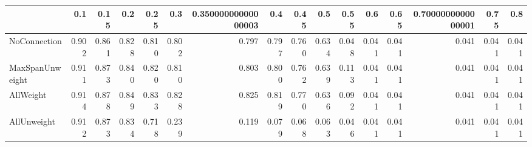 \begin{tabular}{lrrrrrrrrrrrrrrr}
\toprule
{} &   0.1 &  0.15 &   0.2 &  0.25 &   0.3 & 0.35000000000000003 &   0.4 &  0.45 &   0.5 &  0.55 &   0.6 &  0.65 & 0.7000000000000001 &  0.75 &   0.8 \\
\midrule
NoConnection    & 0.902 & 0.861 & 0.828 & 0.810 & 0.802 &               0.797 & 0.797 & 0.760 & 0.634 & 0.048 & 0.041 & 0.041 &              0.041 & 0.041 & 0.041 \\
MaxSpanUnweight & 0.911 & 0.873 & 0.840 & 0.820 & 0.810 &               0.803 & 0.800 & 0.762 & 0.639 & 0.113 & 0.041 & 0.041 &              0.041 & 0.041 & 0.041 \\
AllWeight       & 0.914 & 0.878 & 0.849 & 0.833 & 0.828 &               0.825 & 0.819 & 0.770 & 0.636 & 0.092 & 0.041 & 0.041 &              0.041 & 0.041 & 0.041 \\
AllUnweight     & 0.912 & 0.873 & 0.834 & 0.718 & 0.239 &               0.119 & 0.079 & 0.068 & 0.063 & 0.046 & 0.041 & 0.041 &              0.041 & 0.041 & 0.041 \\
\bottomrule
\end{tabular}
